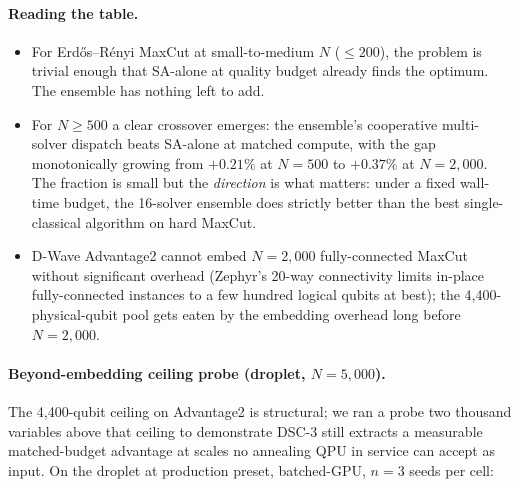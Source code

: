 \documentclass[11pt,a4paper]{article}
\begin{document}
\paragraph{Reading the table.}
\begin{itemize}\itemsep0.25em
\item For Erdős--Rényi MaxCut at small-to-medium $N$ ($\le 200$), the
  problem is trivial enough that SA-alone at quality budget already
  finds the optimum. The ensemble has nothing left to add.
\item For $N\!\ge\!500$ a clear crossover emerges: the ensemble's
  cooperative multi-solver dispatch beats SA-alone at matched compute,
  with the gap monotonically growing from $+0.21\%$ at $N\!=\!500$ to
  $+0.37\%$ at $N\!=\!2{,}000$. The fraction is small but the
  \emph{direction} is what matters: under a fixed wall-time budget,
  the 16-solver ensemble does strictly better than the best
  single-classical algorithm on hard MaxCut.
\item D-Wave Advantage2 cannot embed $N\!=\!2{,}000$ fully-connected
  MaxCut without significant overhead (Zephyr's 20-way connectivity
  limits in-place fully-connected instances to a few hundred logical
  qubits at best); the 4{,}400-physical-qubit pool gets eaten by the
  embedding overhead long before $N\!=\!2{,}000$.
\end{itemize}

\paragraph{Beyond-embedding ceiling probe (droplet, $N\!=\!5{,}000$).}
The 4{,}400-qubit ceiling on Advantage2 is structural; we ran a probe
two thousand variables above that ceiling to demonstrate DSC-3 still
extracts a measurable matched-budget advantage at scales no annealing
QPU in service can accept as input. On the droplet at production
preset, batched-GPU, $n\!=\!3$ seeds per cell:
\end{document}
